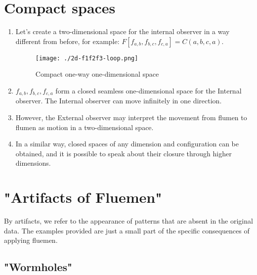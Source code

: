 \documentclass[final]{article}
\begin{document}
    \section{Compact spaces}
        \begin{enumerate}

            \item Let’s create a two-dimensional space for the internal observer in a way different from before, for example: \( F[f_{a,b},f_{b,c},f_{c,a}] = C(a,b,c,a) \).

            \begin{figure}[H]
                \centering
                \texttt{[image: ./2d-f1f2f3-loop.png]}
                \caption{Compact one-way one-dimensional space}
                \label{fig:image}
            \end{figure}

            \item \(f_{a,b},f_{b,c},f_{c,a}\) form a closed seamless one-dimensional space for the Internal observer. The Internal observer can move infinitely in one direction.

            \item However, the External observer may interpret the movement from flumen to flumen as motion in a two-dimensional space.

            \item In a similar way, closed spaces of any dimension and configuration can be obtained, and it is possible to speak about their closure through higher dimensions.

        \end{enumerate}


    \section{"Artifacts of Fluemen"}

        By artifacts, we refer to the appearance of patterns that are absent in 
        the original data. The examples provided are just a small part of the 
        specific consequences of applying fluemen.

        \subsection{"Wormholes"}
\end{document}
